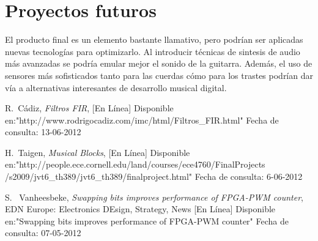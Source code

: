 \documentclass[12pt,journal]{IEEEtran}
\begin{document}
\section{Proyectos futuros}
El producto final es un elemento bastante llamativo, pero podr\'ian ser aplicadas nuevas tecnolog\'ias para optimizarlo. Al introducir t\'ecnicas de sintesis de audio m\'as avanzadas se podr\'ia emular mejor el sonido de la guitarra. Adem\'as, el uso de sensores m\'as sofisticados tanto para las cuerdas c\'omo para los trastes podr\'ian dar v\'ia a alternativas interesantes de desarrollo musical digital.  

\begin{thebibliography}{1}


R.~C\'adiz, \emph{Filtros FIR}, [En L\'inea] Disponible en:"http://www.rodrigocadiz.com/imc/html/Filtros\_FIR.html" Fecha de consulta: 13-06-2012

H.~Taigen, \emph{Musical Blocks}, [En L\'inea] Disponible en:"http://people.ece.cornell.edu/land/courses/ece4760/FinalProjects\\/s2009/jvt6\_th389/jvt6\_th389/finalproject.html" Fecha de consulta: 6-06-2012

S. ~Vanheesbeke, \emph{Swapping bits improves performance of FPGA-PWM counter}, EDN Europe: Electronics DEsign, Strategy, News [En L\'inea] Disponible en:"Swapping bits improves performance of FPGA-PWM counter" Fecha de consulta: 07-05-2012

\end{thebibliography}
\end{document}
